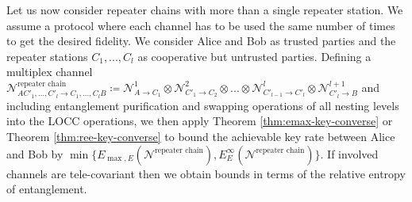 \documentclass[aps,pra,twocolumn,superscriptaddress,longbibliography]{revtex4-1}
\newcommand{\mc}[1]{\mathcal{#1}}
\begin{document}
\begin{appendix}
Let us now consider repeater chains with more than a single repeater station. We assume a protocol where each channel has to be used the same number of times to get the desired fidelity. We consider Alice and Bob as trusted parties and the repeater stations $C_1,...,C_l$ as cooperative but untrusted parties. Defining a multiplex channel ${\mc N}^{\text{repeater chain}}_{AC'_1,...,C'_l\to C_1,...,C_lB}\coloneqq {\mc N}^1_{A\to C_1}\otimes{\mc N}^2_{C'_1\to C_2}\otimes...\otimes {\mc N}^{l}_{C'_{l-1}\to C'_l}\otimes{\mc N}^{l+1}_{C'_{l}\to B}$ and including entanglement purification and swapping operations of all nesting levels into the LOCC operations, we then apply Theorem \ref{thm:emax-key-converse} or Theorem \ref{thm:ree-key-converse} to bound the achievable key rate between Alice and Bob by $\min\{E_{\max,E}({\mc N}^{\text{repeater chain}}),E^\infty_{E}({\mc N}^{\text{repeater chain}})\}$. If involved channels are tele-covariant then we obtain bounds in terms of the relative entropy of entanglement. 


\end{appendix}
\end{document}
